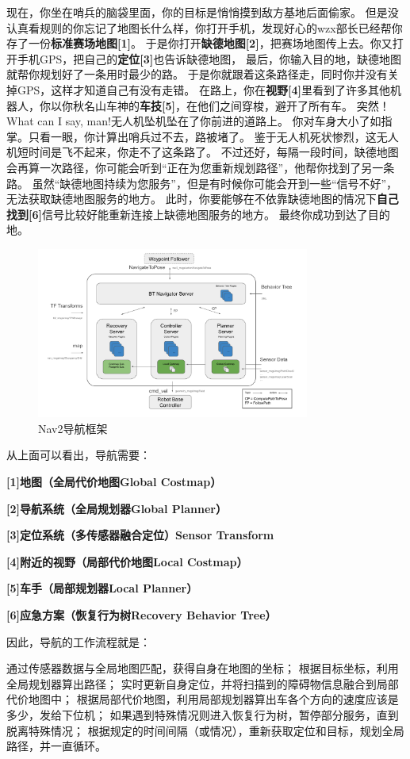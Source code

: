 现在，你坐在哨兵的脑袋里面，你的目标是悄悄摸到敌方基地后面偷家。
但是没认真看规则的你忘记了地图长什么样，你打开手机，发现好心的wzx部长已经帮你存了一份\textbf{标准赛场地图[1]}。
于是你打开\textbf{缺德地图[2]}，把赛场地图传上去。你又打开手机GPS，把自己的\textbf{定位[3]}也告诉缺德地图，
最后，你输入目的地，缺德地图就帮你规划好了一条用时最少的路。
于是你就跟着这条路径走，同时你并没有关掉GPS，这样才知道自己有没有走错。
在路上，你在\textbf{视野[4]}里看到了许多其他机器人，你以你秋名山车神的\textbf{车技[5]}，在他们之间穿梭，避开了所有车。
突然！What can I say, man!无人机坠机坠在了你前进的道路上。
你对车身大小了如指掌。只看一眼，你计算出哨兵过不去，路被堵了。
鉴于无人机死状惨烈，这无人机短时间是飞不起来，你走不了这条路了。
不过还好，每隔一段时间，缺德地图会再算一次路径，你可能会听到“正在为您重新规划路径”，他帮你找到了另一条路。
虽然“缺德地图持续为您服务”，但是有时候你可能会开到一些“信号不好”，无法获取缺德地图服务的地方。
此时，你要能够在不依靠缺德地图的情况下\textbf{自己找到[6]}信号比较好能重新连接上缺德地图服务的地方。
最终你成功到达了目的地。

\begin{figure}[H]
    \centering
    \includegraphics[width=0.8\textwidth]{./images/Nav2导航框架.png}
    \caption{Nav2导航框架}
    \end{figure}
从上面可以看出，导航需要：

\textbf{[1]地图（全局代价地图Global Costmap）}

\textbf{[2]导航系统（全局规划器Global Planner）}

\textbf{[3]定位系统（多传感器融合定位）Sensor Transform}

\textbf{[4]附近的视野（局部代价地图Local Costmap）}

\textbf{[5]车手（局部规划器Local Planner）}

\textbf{[6]应急方案（恢复行为树Recovery Behavior Tree）}

因此，导航的工作流程就是：

通过传感器数据与全局地图匹配，获得自身在地图的坐标；
根据目标坐标，利用全局规划器算出路径；
实时更新自身定位，并将扫描到的障碍物信息融合到局部代价地图中；
根据局部代价地图，利用局部规划器算出车各个方向的速度应该是多少，发给下位机；
如果遇到特殊情况则进入恢复行为树，暂停部分服务，直到脱离特殊情况；
根据规定的时间间隔（或情况），重新获取定位和目标，规划全局路径，并一直循环。
